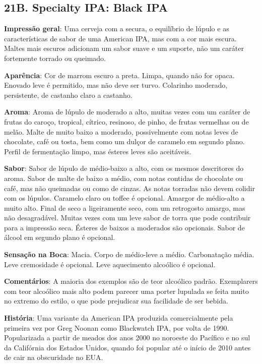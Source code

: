\subsection*{21B. Specialty IPA: Black IPA}
\textbf{Impressão geral}: Uma cerveja com a secura, o equilíbrio de lúpulo e as características de sabor de uma American IPA, mas com a cor mais escura. Maltes mais escuros adicionam um sabor suave e um suporte, não um caráter fortemente torrado ou queimado.

\textbf{Aparência}: Cor de marrom escuro a preta. Limpa, quando não for opaca. Enovado leve é permitido, mas não deve ser turvo. Colarinho moderado, persistente, de castanho claro a castanho.

\textbf{Aroma}: Aroma de lúpulo de moderado a alto, muitas vezes com um caráter de frutas do caroço, tropical, cítrico, resinoso, de pinho, de frutas vermelhas ou de melão. Malte de muito baixo a moderado, possivelmente com notas leves de chocolate, café ou tosta, bem como um dulçor de caramelo em segundo plano. Perfil de fermentação limpo, mas ésteres leves são aceitáveis.

\textbf{Sabor}: Sabor de lúpulo de médio-baixo a alto, com os mesmos descritores do aroma. Sabor de malte de baixo a médio, com notas contidas de chocolate ou café, mas não queimadas ou como de cinzas. As notas torradas não devem colidir com os lúpulos. Caramelo claro ou toffee é opcional. Amargor de médio-alto a muito alto. Final de seco a ligeiramente seco, com um retrogosto amargo, mas não desagradável. Muitas vezes com um leve sabor de torra que pode contribuir para a impressão seca. Ésteres de baixos a moderados são opcionais. Sabor de álcool em segundo plano é opcional.

\textbf{Sensação na Boca}: Macia. Corpo de médio-leve a médio. Carbonatação média. Leve cremosidade é opcional. Leve aquecimento alcoólico é opcional.

\textbf{Comentários}: A maioria dos exemplos são de teor alcoólico padrão. Exemplarers com teor alcoólico mais alto podem parecer uma porter lupulada se feita muito no extremo do estilo, o que pode prejudicar sua facilidade de ser bebida.

\textbf{História}: Uma variante da American IPA produzida comercialmente pela primeira vez por Greg Noonan como Blackwatch IPA, por volta de 1990. Popularizada a partir de meados dos anos 2000 no noroeste do Pacífico e no sul da Califórnia dos Estados Unidos, quando foi popular até o início de 2010 antes de cair na obscuridade no EUA.

